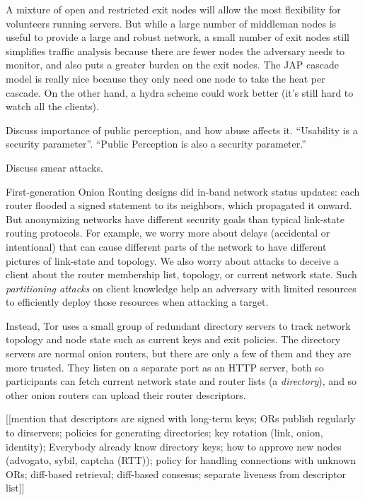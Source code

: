 \documentclass[times,10pt,twocolumn]{article}
\begin{document}
A mixture of open and restricted exit nodes will allow the most
flexibility for volunteers running servers. But while a large number
of middleman nodes is useful to provide a large and robust network,
a small number of exit nodes still simplifies traffic analysis because
there are fewer nodes the adversary needs to monitor, and also puts a
greater burden on the exit nodes.
The JAP cascade model is really nice because they only need one node to
take the heat per cascade. On the other hand, a hydra scheme could work
better (it's still hard to watch all the clients).

Discuss importance of public perception, and how abuse affects it.
``Usability is a security parameter''.  ``Public Perception is also a
security parameter.''

Discuss smear attacks.

\label{subsec:dirservers}

First-generation Onion Routing designs \cite{or-jsac98,freedom2-arch} did
in-band network status updates: each router flooded a signed statement
to its neighbors, which propagated it onward. But anonymizing networks
have different security goals than typical link-state routing protocols.
For example, we worry more about delays (accidental or intentional)
that can cause different parts of the network to have different pictures
of link-state and topology. We also worry about attacks to deceive a
client about the router membership list, topology, or current network
state. Such \emph{partitioning attacks} on client knowledge help an
adversary with limited resources to efficiently deploy those resources
when attacking a target.

Instead, Tor uses a small group of redundant directory servers to
track network topology and node state such as current keys and exit
policies. The directory servers are normal onion routers, but there are
only a few of them and they are more trusted. They listen on a separate
port as an HTTP server, both so participants can fetch current network
state and router lists (a \emph{directory}), and so other onion routers
can upload their router descriptors.

[[mention that descriptors are signed with long-term keys; ORs publish
    regularly to dirservers; policies for generating directories; key
    rotation (link, onion, identity); Everybody already know directory
    keys; how to approve new nodes (advogato, sybil, captcha (RTT));
    policy for handling connections with unknown ORs; diff-based
    retrieval; diff-based consesus; separate liveness from descriptor
    list]]
\end{document}
